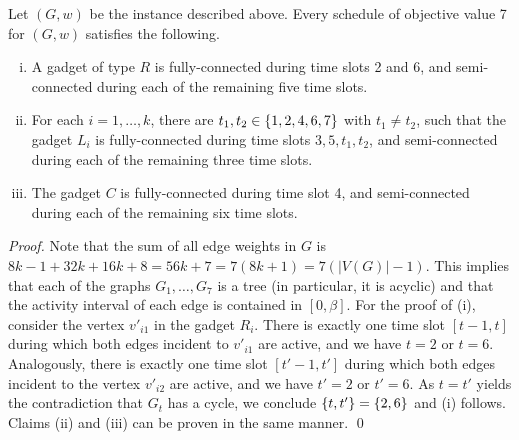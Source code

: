 \begin{lemma}
\label{lemma:gadgets_properties}
Let $(G,w)$ be the instance described above. 
Every schedule of objective value 7 for $(G, w)$ satisfies the following.
\begin{enumerate}[(i)]
\item A gadget of type $R$ is fully-connected during time slots 2 and 6, and 
semi-connected during each of the remaining five time slots.
\item For each $i=1,\dots,k$, there are $t_1,t_2 \in \{ 1,2,4,6,7 \}$ with $t_1\ne t_2$, such that the gadget $L_i$ is fully-connected during time slots $3,5,t_1, t_2$, 
and semi-connected during each of the remaining three time slots.
\item The gadget $C$ is fully-connected during time slot 4, 
and semi-connected during each of the remaining six time slots.
\end{enumerate}
\end{lemma}
\begin{proof}
Note that the sum of all edge weights in $G$ is $8k-1 +32k +16k +8 = 56k+7 = 7(8k + 1) = 7(|V(G)|-1)$. 
This implies that each of the graphs $G_1,\ldots,G_7$ is a tree (in particular, it is acyclic) and that the activity interval of each edge is contained in $[0, \beta]$.
For the proof of (i), consider the vertex $v'_{i1}$ in the gadget $R_i$. 
There is exactly one time slot $[t-1, t]$ during which both edges incident to $v'_{i1}$ are active, 
and we have $t=2$ or $t=6$. 
Analogously, there is exactly one time slot $[t'-1, t']$ during which both edges incident to 
the vertex $v'_{i2}$ are active, and we have $t' = 2$ or $t' = 6$. 
As $t=t'$ yields the contradiction that $G_t$ has a cycle, we conclude $\{ t,t' \}=\{ 2,6 \}$ and (i) follows. 
Claims (ii) and (iii) can be proven in the same manner. 
\qed
\end{proof}

